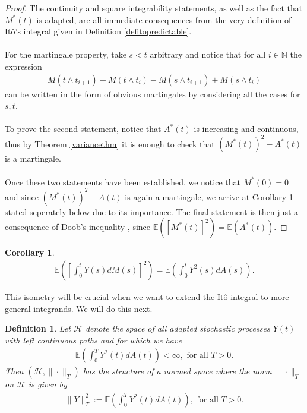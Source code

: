 \documentclass[11pt,a4paper, final]{article}
\newtheorem{cor}{Corollary}[thm]
\newtheorem{defn}{Definition}[section]
\begin{document}
\begin{proof}
The continuity and square integrability statements, as well as the fact that $M^*(t)$ is adapted, are all immediate consequences from the very definition of Itô's integral given in Definition \ref{defitopredictable}.
\\\\
For the martingale property, take $s < t$ arbitrary and notice that for all $i \in \mathbb{N}$ the expression
\begin{align*}
M(t \wedge t_{i+1}) - M(t \wedge t_i) - M (s \wedge t_{i+1}) + M( s \wedge t_i)
\end{align*}
can be written in the form of obvious martingales by considering all the cases for $s,t$. 
\\\\
To prove the second statement, notice that $A^*(t)$ is increasing and continuous, thus by Theorem \ref{variancethm} it is enough to check that $(M^*(t))^2 - A^*(t)$ is a martingale. 
\\\\
Once these two statements have been established, we notice that $M^*(0)=0$ and since $(M^*(t))^2-A(t)$ is again a martingale, we arrive at Corollary \ref{corisometry} stated seperately below due to its importance. The final statement is then just a consequence of Doob's inequality \cite[Theorem A.42 \& Remark after 5.10 p.~198]{Liggett}, since $ \mathbb{E}([M^*(t)]^2) = \mathbb{E}(A^*(t))$. 
\end{proof}
\begin{cor} \label{corisometry} \begin{align*}
\mathbb{E} \left( \left[ \int_0^t Y(s) dM(s) \right]^2\right) = \mathbb{E} \left( \int_0^t Y^2(s) dA(s) \right).
\end{align*}
\end{cor}
\noindent This isometry will be crucial when we want to extend the Itô integral to more general integrands. We will do this next.
\newpage
\begin{defn} Let $\mathcal{H}$ denote the space of all adapted stochastic processes $Y(t)$ with left continuous paths and for which we have
\begin{align*}
\mathbb{E} \left( \int_0^T Y^2(t) dA(t) \right) < \infty, \text{ for all } T >0.
\end{align*}
Then $( \mathcal{H}, \| \cdot \|_T )$ has the structure of a normed space where the norm $\| \cdot \|_T$ on $\mathcal{H}$ is given by 
\begin{align*}
\| Y\|_T^2 := \mathbb{E} \left( \int_0^T Y^2(t) dA(t) \right), \text{ for all } T >0.
\end{align*}
\end{defn}
\end{document}
